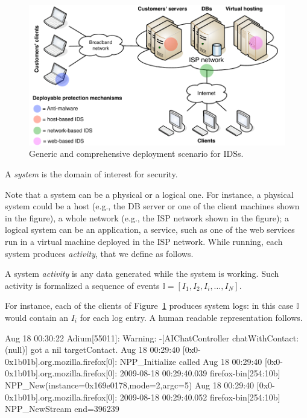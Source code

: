 \begin{figure}[t]
  \centering
  \includegraphics[width=\textwidth]{figures/detection/ids-generic-scenario}
  \caption{Generic and comprehensive deployment scenario for
  \acp{IDS}.}
  \label{fig:ids-generic-scenario}
\end{figure}

\begin{definition}[System]
  A \emph{system} is the domain of interest for security.
\end{definition}

\noindent Note that a system can be a physical or a logical one. For
instance, a physical system could be a host (e.g., the
\ac{DB} server or one of the client machines shown in the
figure), a whole network (e.g., the \ac{ISP} network shown in the
figure); a logical system can be an application, a service, such as
one of the web services run in a virtual machine deployed in the
\ac{ISP} network. While running, each system produces \emph{activity},
that we define as follows.

\begin{definition}
  A system \emph{activity} is any data generated while the system is
  working. Such activity is formalized a sequence of events
  $\mathbb{I} = [I_{1}, I_{2}, I_{i}, \dots, I_{N}]$.
\end{definition}

\noindent For instance, each of the clients of
Figure~\ref{fig:ids-generic-scenario} produces system logs: in this
case $\mathbb{I}$ would contain an $I_{i}$ for each log entry. A human
readable representation follows.

\begin{logs} Aug 18 00:30:22 Adium[55011]: Warning: -[AIChatController
chatWithContact:(null)] got a nil targetContact.  Aug 18 00:29:40
[0x0-0x1b01b].org.mozilla.firefox[0]: NPP_Initialize called Aug 18
00:29:40 [0x0-0x1b01b].org.mozilla.firefox[0]: 2009-08-18 00:29:40.039
firefox-bin[254:10b] NPP_New(instance=0x169e0178,mode=2,argc=5) Aug 18
00:29:40 [0x0-0x1b01b].org.mozilla.firefox[0]: 2009-08-18 00:29:40.052
firefox-bin[254:10b] NPP_NewStream end=396239
\end{logs}

